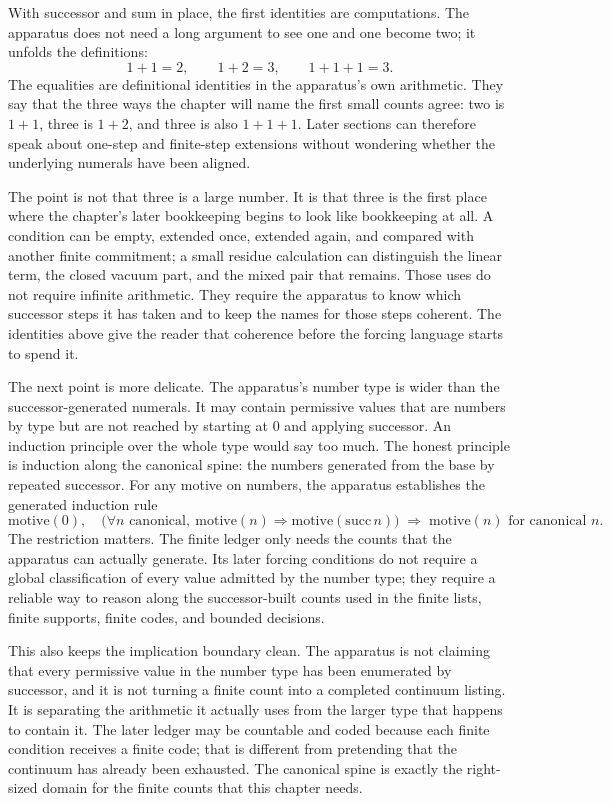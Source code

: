 With successor and sum in place, the first identities are computations. The
apparatus does not need a long argument to see one and one become two; it
unfolds the definitions:
\[
  1 + 1 = 2,
  \qquad
  1 + 2 = 3,
  \qquad
  1 + 1 + 1 = 3.
\]
The equalities are definitional identities in the apparatus's own arithmetic.
They say that the three ways the chapter will name the first small counts agree:
two is \(1+1\), three is \(1+2\), and three is also \(1+1+1\). Later sections can
therefore speak about one-step and finite-step extensions without wondering
whether the underlying numerals have been aligned.

The point is not that three is a large number. It is that three is the first
place where the chapter's later bookkeeping begins to look like bookkeeping at
all. A condition can be empty, extended once, extended again, and compared with
another finite commitment; a small residue calculation can distinguish the
linear term, the closed vacuum part, and the mixed pair that remains. Those
uses do not require infinite arithmetic. They require the apparatus to know
which successor steps it has taken and to keep the names for those steps
coherent. The identities above give the reader that coherence before the
forcing language starts to spend it.

The next point is more delicate. The apparatus's number type is wider than the
successor-generated numerals. It may contain permissive values that are numbers
by type but are not reached by starting at \(0\) and applying successor. An
induction principle over the whole type would say too much. The honest
principle is induction along the canonical spine: the numbers generated from
the base by repeated successor. For any motive on numbers, the apparatus establishes
the generated induction rule
\[
  \text{motive}(0),
  \quad
  \big(\forall n \text{ canonical},\ \text{motive}(n) \Rightarrow \text{motive}(\mathrm{succ}\,n)\big)
  \;\Longrightarrow\;
  \text{motive}(n) \text{ for canonical } n.
\]
The restriction matters. The finite ledger only needs the counts that the
apparatus can actually generate. Its later forcing conditions do not require a
global classification of every value admitted by the number type; they require a
reliable way to reason along the successor-built counts used in the finite
lists, finite supports, finite codes, and bounded decisions.

This also keeps the implication boundary clean. The apparatus is not claiming
that every permissive value in the number type has been enumerated by successor,
and it is not turning a finite count into a completed continuum listing. It is
separating the arithmetic it actually uses from the larger type that happens to
contain it. The later ledger may be countable and coded because each finite
condition receives a finite code; that is different from pretending that the
continuum has already been exhausted. The canonical spine is exactly the
right-sized domain for the finite counts that this chapter needs.


